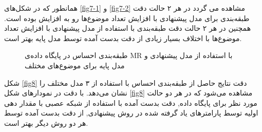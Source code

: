\documentclass[12pt,a4paper]{article}
\begin{document}
همانطور که در شکل‌های 
\ref{fig7-1}
و
\ref{fig7-2}
مشاهده می گردد در هر ۲ حالت دقت طبقه‌بندی برای مدل پیشنهادی با افزایش تعداد موضوع‌ها رو به افزایش بوده است. همچنین در هر ۲ حالت دقت طبقه‌بندی با استفاده از مدل پیشنهادی با افزایش تعداد موضوع‌ها با اختلاف بسيار زیادی از دقت بدست آمده توسط مدل ‌پایه بهتر است. 
\begin{figure}[!t]
	\centering
	\caption{طبقه‌بندی احساس در پایگاه داده‌ی MR با استفاده از مدل پیشنهادی و مدل پایه برای موضوع‌های مختلف}
	\label{fig7}
\end{figure}

شکل 
\ref{fig8}
دقت نتایج حاصل از طبقه‌بندی احساس با استفاده از ۳ مدل مختلف را نشان می‌دهد. با دقت در نمودارهای شکل
\ref{fig8}
مشاهده می‌شود که در هر دو حالت مورد نظر برای پایگاه داده, دقت بدست آمده با استفاده از شبکه عصبی با مقدار دهی اولیه توسط پارامترهای یاد گرفته شده در روش پیشنهادی, از دقت بدست آمده توسط هر دو روش دیگر بهتر است.
\end{document}
